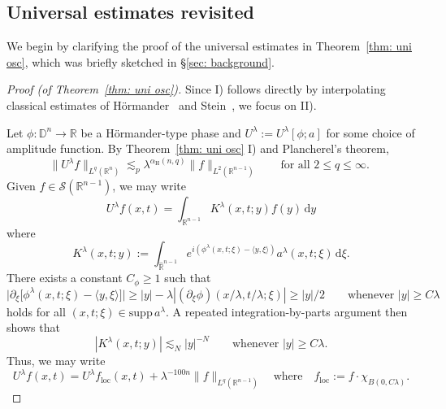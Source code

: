 \documentclass[reqno]{amsart}
\numberwithin{equation}{section}
\newcommand{\D}{\mathbb{D}}
\newcommand{\R}{\mathbb{R}}
\newcommand{\cS}{\mathcal{S}}
\newcommand{\ud}{\mathrm{d}}
\def\inn#1#2{\langle#1,#2\rangle}
\theoremstyle{plain}
\theoremstyle{definition}
\newcommand{\supp}{\mathrm{supp}\,}
\begin{document}





\subsection{Universal estimates revisited}\label{subsec: loc osc} 

We begin by clarifying the proof of the universal estimates in Theorem~\ref{thm: uni osc}, which was briefly sketched in \S\ref{sec: background}. 

\begin{proof}[Proof (of Theorem~\ref{thm: uni osc})] Since I) follows directly by interpolating classical estimates of H\"ormander~\cite{Hormander1973} and Stein~\cite{Stein1986}, we focus on II). 


Let $\phi \colon \D^n \to \R$ be a H\"ormander-type phase and $U^{\lambda} := U^{\lambda}[\phi;a]$ for some choice of amplitude function. By Theorem~\ref{thm: uni osc} I) and Plancherel's theorem, 
\begin{equation}\label{eq: pseduo loc 1}
    \|U^{\lambda}f\|_{L^q(\R^n)} \lesssim_p \lambda^{\alpha_{\mathrm{H}}(n,q)} \|f\|_{L^2(\R^{n-1})} \qquad \textrm{for all $2 \leq q \leq \infty$. }
\end{equation}
Given $f \in \cS(\R^{n-1})$, we may write
\begin{equation*}
    U^{\lambda}f(x, t) = \int_{\R^{n-1}} K^{\lambda}(x, t;y) f(y)\,\ud y
\end{equation*}
where 
\begin{equation*}
   K^{\lambda}(x,t ; y) := \int_{\widehat{\R}^{n-1}} e^{i (\phi^{\lambda}(x, t;\xi) - \inn{y}{\xi})} a^{\lambda}(x, t;\xi)\,\ud \xi. 
\end{equation*}
There exists a constant $C_{\phi} \geq 1$ such that
\begin{equation*}
    \big|\partial_{\xi} \big[\phi^{\lambda}(x, t;\xi) - \inn{y}{\xi}]\big| \geq |y| - \lambda |(\partial_{\xi}\phi)(x/\lambda, t/\lambda;\xi)| \geq |y|/2 \qquad \textrm{whenever $|y| \geq C\lambda$} 
\end{equation*}
holds for all $(x,t;\xi) \in \supp a^{\lambda}$. A repeated integration-by-parts argument then shows that 
\begin{equation*}
    |K^{\lambda}(x,t;y)| \lesssim_N |y|^{-N}  \qquad \textrm{whenever $|y| \geq C\lambda$.}
\end{equation*}
Thus, we may write 
\begin{equation}\label{eq: pseduo loc 2}
   U^{\lambda}f(x,t) = U^{\lambda}f_{\mathrm{loc}}(x,t) + \lambda^{-100n} \|f\|_{L^q(\R^{n-1})}  \quad \textrm{where} \quad f_{\mathrm{loc}} := f \cdot \chi_{B(0, C\lambda)}.
\end{equation}


\end{proof}
\end{document}
